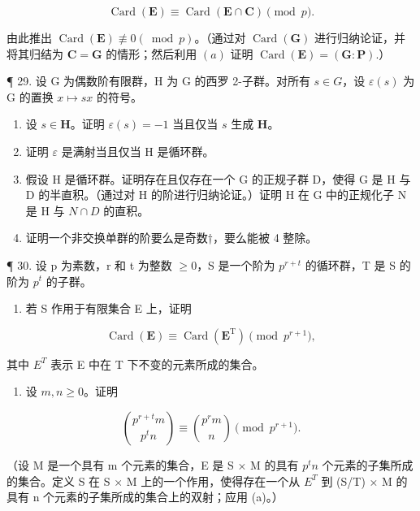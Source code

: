\[
\operatorname{Card} (\mathbf {E}) \equiv \operatorname{Card} (\mathbf {E} \cap \mathbf {C}) \pmod {p}.
\]

由此推出 \(\operatorname{Card}(\mathbf{E}) \not\equiv 0 (\bmod p)\)。（通过对 \(\operatorname{Card}(\mathbf{G})\) 进行归纳论证，并将其归结为 \(\mathbf{C} = \mathbf{G}\) 的情形；然后利用 \((a)\) 证明 \(\operatorname{Card}(\mathbf{E}) = (\mathbf{G}:\mathbf{P}).\)）

¶ 29. 设 G 为偶数阶有限群，H 为 G 的西罗 2-子群。对所有 \(s \in G\)，设 \(\varepsilon(s)\) 为 G 的置换 \(x \mapsto sx\) 的符号。

\begin{enumerate}
\def\labelenumi{(\alph{enumi})}
\item
  设 \(s \in \mathbf{H}\)。证明 \(\varepsilon(s) = -1\) 当且仅当 \(s\) 生成 \(\mathbf{H}\)。
\item
  证明 \(\varepsilon\) 是满射当且仅当 H 是循环群。
\item
  假设 H 是循环群。证明存在且仅存在一个 G 的正规子群 D，使得 G 是 H 与 D 的半直积。（通过对 H 的阶进行归纳论证。）证明 H 在 G 中的正规化子 N 是 H 与 \(N \cap D\) 的直积。
\item
  证明一个非交换单群的阶要么是奇数†，要么能被 4 整除。
\end{enumerate}

¶ 30. 设 p 为素数，r 和 t 为整数 \(\geqslant0\)，S 是一个阶为 \(p^{r+t}\) 的循环群，T 是 S 的阶为 \(p^{t}\) 的子群。

\begin{enumerate}
\def\labelenumi{(\alph{enumi})}
\tightlist
\item
  若 S 作用于有限集合 E 上，证明
\end{enumerate}

\[
\operatorname{Card} (\mathbf {E}) \equiv \operatorname{Card} (\mathbf {E} ^ {\mathrm{T}}) \pmod {p ^ {r + 1}},
\]

其中 \(E^{T}\) 表示 E 中在 T 下不变的元素所成的集合。

\begin{enumerate}
\def\labelenumi{(\alph{enumi})}
\setcounter{enumi}{1}
\tightlist
\item
  设 \(m, n \geqslant 0\)。证明
\end{enumerate}

\[
\binom {p ^ {r + t} m} {p ^ {t} n} \equiv \binom {p ^ {r} m} {n} \pmod {p ^ {r + 1}}.
\]

（设 M 是一个具有 m 个元素的集合，E 是 S × M 的具有 \(p^{t}n\) 个元素的子集所成的集合。定义 S 在 S × M 上的一个作用，使得存在一个从 \(E^{T}\) 到 (S/T) × M 的具有 n 个元素的子集所成的集合上的双射；应用 (a)。）

